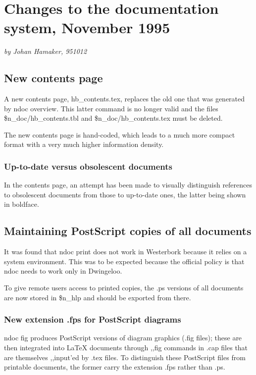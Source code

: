%
%
\chapter{ Changes to the \NEWSTAR documentation system, November 1995}
{\center\it by Johan Hamaker, 951012}

\tableofcontents

\section{ New contents page}

	A new contents page, hb\_contents.tex, replaces the old one that was
generated by ndoc overview. This latter command is no longer valid and the
files \$n\_doc/hb\_contents.tbl and \$n\_doc/hb\_contents.tex must be deleted.

	The new contents page is hand-coded, which leads to a much more compact
format with a very much higher information density.


\subsection{ Up-to-date versus obsolescent documents}

	In the contents page, an attempt has been made to visually distinguish
references to obsolescent documents from those to up-to-date ones, the latter
being shown in boldface.



\section{ Maintaining PostScript copies of all documents}

	It was found that ndoc print does not work in Westerbork because it
relies on a system environment. This was to be expected because the official
\NEWSTAR policy is that ndoc needs to work only in Dwingeloo.

	To give remote users access to printed copies, the .ps versions of all
documents are now stored in \$n\_hlp and should be exported from there.


\subsection{ New extension .fps for PostScript diagrams}

	ndoc fig produces PostScript versions of diagram graphics (.fig files);
these are then integrated into LaTeX documents through ,,fig commands in .cap
files that are themselves ,,input'ed by .tex files. To distinguish these
PostScript files from printable documents, the former carry the extension .fps
rather than .ps.



